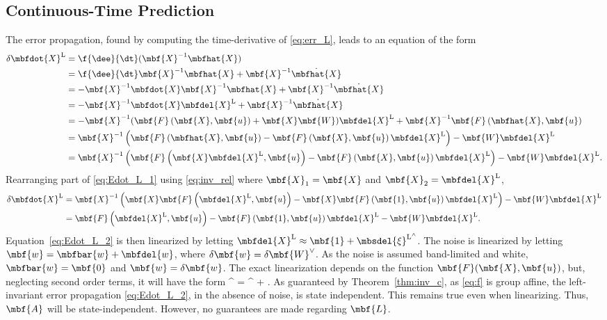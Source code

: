 \subsection{Continuous-Time Prediction}
\label{ssec:ctp_L}
The error propagation, found by computing the time-derivative of \eqref{eq:err_L}, leads to an equation of the form
\begin{align}
	\delta \mbfdot{X}^\mathrm{L}& = \f{\dee}{\dt}(\mbf{X}^{-1}\mbfhat{X}) \notag \\
	&= \f{\dee}{\dt}\mbf{X}^{-1} \mbfhat{X} + \mbf{X}^{-1} \dot{\mbfhat{X}} \nonumber \\
	& = -\mbf{X}^{-1}\mbfdot{X}\mbf{X}^{-1}\mbfhat{X} + \mbf{X}^{-1}\dot{\mbfhat{X}} \nonumber \\
	& = -\mbf{X}^{-1}\mbfdot{X}\mbfdel{X}^\mathrm{L} + \mbf{X}^{-1}\dot{\mbfhat{X}} \nonumber \\
	& = -\mbf{X}^{-1}(\mbf{F}\left(\mbf{X},\mbf{u}\right) + \mbf{X}\mbf{W})\mbfdel{X}^\mathrm{L} + \mbf{X}^{-1}\mbf{F}\left(\mbfhat{X},\mbf{u}\right) \nonumber \\
	& = \mbf{X}^{-1}\left(\mbf{F}\left(\mbfhat{X},\mbf{u}\right) -\mbf{F}\left(\mbf{X},\mbf{u}\right)\mbfdel{X}^\mathrm{L}\right) -\mbf{W}\mbfdel{X}^\mathrm{L} \nonumber \\
	& = \mbf{X}^{-1}\left(\mbf{F}\left(\mbf{X}\mbfdel{X}^\mathrm{L},\mbf{u}\right) -\mbf{F}\left(\mbf{X},\mbf{u}\right)\mbfdel{X}^\mathrm{L}\right) -\mbf{W}\mbfdel{X}^\mathrm{L}. \label{eq:Edot_L_1} 
\end{align}
Rearranging part of \eqref{eq:Edot_L_1} using \eqref{eq:inv_rel} where $\mbf{X}_1 = \mbf{X}$ and $\mbf{X}_2 = \mbfdel{X}^\mathrm{L}$,
\begin{align}
	\delta \mbfdot{X}^\mathrm{L}& = \mbf{X}^{-1}\left(\mbf{X}\mbf{F}\left(\mbfdel{X}^\mathrm{L},\mbf{u}\right) - \mbf{X}\mbf{F}\left(\mbf{1},\mbf{u}\right)\mbfdel{X}^\mathrm{L}\right) -\mbf{W}\mbfdel{X}^\mathrm{L} \nonumber \\
	& =\mbf{F}\left(\mbfdel{X}^\mathrm{L},\mbf{u}\right) -\mbf{F}\left(\mbf{1},\mbf{u}\right)\mbfdel{X}^\mathrm{L} -\mbf{W}\mbfdel{X}^\mathrm{L}. \label{eq:Edot_L_2}
\end{align}
Equation~\eqref{eq:Edot_L_2} is then linearized by letting $\mbfdel{X}^\mathrm{L} \approx \mbf{1} + \mbsdel{\xi}^{\mathrm{L}^\wedge}$. The noise is linearized by letting $\mbf{w} = \mbfbar{w} + \mbfdel{w}$, where $\delta \mbf{w} = \delta \mbf{W}^{\vee}$. As the noise is assumed band-limited and white, $\mbfbar{w} = \mbf{0}$ and $\mbf{w} = \delta \mbf{w}$.  The exact linearization depends on the function $\mbf{F}(\mbf{X},\mbf{u})$, but, neglecting second order terms, it will have the form 
\beq
	\delta\mbsdot{\xi}^ = \mbsdel{\xi}^ + \delta {}.
	\label{eq:Edot_L_lin}
\eeq
As guaranteed by Theorem~\ref{thm:inv_c}, as \eqref{eq:f} is group affine, the left-invariant error propagation \eqref{eq:Edot_L_2}, in the absence of noise, is state independent. This remains true even when linearizing. Thus, $\mbf{A}$ will be state-independent. However, no guarantees are made regarding $\mbf{L}$.


